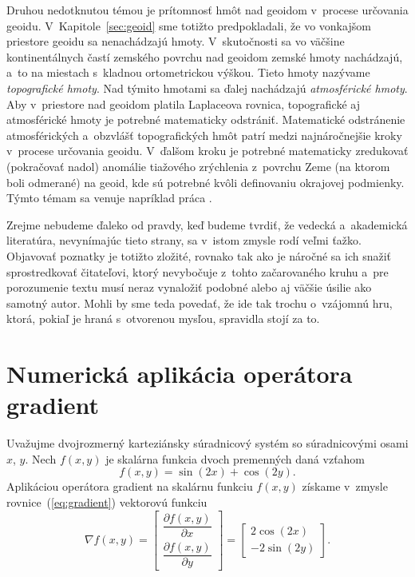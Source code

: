 \documentclass[a4paper,12pt]{book}
\begin{document}
Druhou nedotknutou témou je prítomnosť hmôt nad geoidom v~procese určovania 
geoidu.  V~Kapitole~\ref{sec:geoid} sme totižto predpokladali, že vo vonkajšom 
priestore geoidu sa nenachádzajú hmoty.  V~skutočnosti sa vo väčšine 
kontinentálnych častí zemského povrchu nad geoidom zemské hmoty nachádzajú, 
a~to na miestach s~kladnou ortometrickou výškou.  Tieto hmoty nazývame 
\emph{topografické hmoty}.  Nad týmito hmotami sa ďalej nachádzajú 
\emph{atmosférické hmoty}.  Aby v~priestore nad geoidom platila Laplaceova 
rovnica, topografické aj atmosférické hmoty je potrebné matematicky odstrániť.  
Matematické odstránenie atmosférických a~obzvlášť topografických hmôt patrí 
medzi najnáročnejšie kroky v~procese určovania geoidu.  V~ďalšom kroku je 
potrebné matematicky zredukovať (pokračovať nadol) anomálie tiažového 
zrýchlenia z~povrchu Zeme (na ktorom boli odmerané) na geoid, kde sú potrebné 
kvôli definovaniu okrajovej podmienky.  Týmto témam sa venuje napríklad práca 
\textcite{Janak2006}.

Zrejme nebudeme ďaleko od pravdy, keď budeme tvrdiť, že vedecká a~akademická 
literatúra, nevynímajúc tieto strany, sa v~istom zmysle rodí veľmi ťažko.  
Objavovať poznatky je totižto zložité, rovnako tak ako je náročné sa ich snažiť 
sprostredkovať čitateľovi, ktorý nevybočuje z~tohto začarovaného kruhu a~pre 
porozumenie textu musí neraz vynaložiť podobné alebo aj väčšie úsilie ako 
samotný autor.  Mohli by sme teda povedať, že ide tak trochu o~vzájomnú hru, 
ktorá, pokiaľ je hraná s~otvorenou mysľou, spravidla stojí za to.






\appendix
\chapter{Numerická aplikácia operátora gradient}
\label{app:numerical_application_of_gradient}

Uvažujme dvojrozmerný karteziánsky súradnicový systém so súradnicovými osami 
$x$, $y$.  Nech $f(x, y)$ je skalárna funkcia dvoch premenných daná vzťahom
%
\begin{equation}
\label{eq:f}
f(x, y) = \sin(2x) + \cos(2y){.}
\end{equation}
%
Aplikáciou operátora gradient na skalárnu funkciu $f(x, y)$ získame v~zmysle
rovnice~(\ref{eq:gradient}) vektorovú funkciu
%
\begin{equation}
\label{eq:gradf}
\nabla f(x, y) =
\begin{bmatrix}
\dfrac{\partial f(x, y)}{\partial x} \\[2ex]
\dfrac{\partial f(x, y)}{\partial y}
\end{bmatrix}
=
\begin{bmatrix}
2 \cos(2x) \\[2ex]
-2 \sin(2y)
\end{bmatrix}
{.}
\end{equation}
\end{document}
